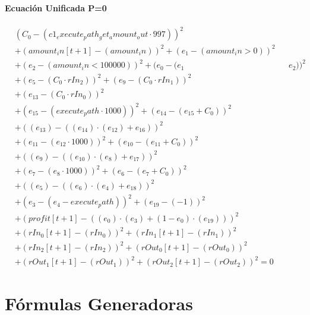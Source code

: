 \documentclass[10pt, a4paper]{article}
\begin{document}
\subsection*{Ecuación Unificada P=0}
\begin{align*}
& (C_{0} - (c1_execute_path_get_amount_out  \cdot  997))^{2} \\
& + (amount_in[t+1] - (amount_in))^{2} + (e_{1} - (amount_in > 0))^{2} \\
& + (e_{2} - (amount_in < 100000))^{2} + (e_{0} - (e_{1} && e_{2}))^{2} \\
& + (e_{5} - (C_{0}  \cdot  rIn_2))^{2} + (e_{9} - (C_{0}  \cdot  rIn_1))^{2} \\
& + (e_{13} - (C_{0}  \cdot  rIn_0))^{2} \\
& + (e_{15} - (execute_path  \cdot  1000))^{2} + (e_{14} - (e_{15} + C_{0}))^{2} \\
& + ((e_{13}) - ((e_{14})  \cdot  (e_{12}) + e_{16}))^{2} \\
& + (e_{11} - (e_{12}  \cdot  1000))^{2} + (e_{10} - (e_{11} + C_{0}))^{2} \\
& + ((e_{9}) - ((e_{10})  \cdot  (e_{8}) + e_{17}))^{2} \\
& + (e_{7} - (e_{8}  \cdot  1000))^{2} + (e_{6} - (e_{7} + C_{0}))^{2} \\
& + ((e_{5}) - ((e_{6})  \cdot  (e_{4}) + e_{18}))^{2} \\
& + (e_{3} - (e_{4} - execute_path))^{2} + (e_{19} - (-1))^{2} \\
& + (profit[t+1] - ((e_{0})  \cdot  (e_{3}) + (1 - e_{0})  \cdot  (e_{19})))^{2} \\
& + (rIn_0[t+1] - (rIn_0))^{2} + (rIn_1[t+1] - (rIn_1))^{2} \\
& + (rIn_2[t+1] - (rIn_2))^{2} + (rOut_0[t+1] - (rOut_0))^{2} \\
& + (rOut_1[t+1] - (rOut_1))^{2} + (rOut_2[t+1] - (rOut_2))^{2} = 0
\end{align*}\part{Fórmulas Generadoras}
\end{document}
